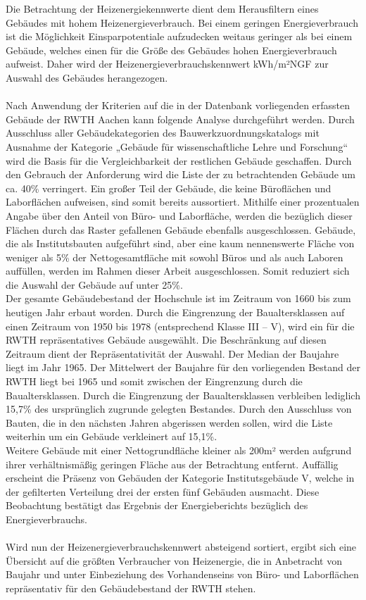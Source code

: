 Die Betrachtung der Heizenergiekennwerte dient dem Herausfiltern eines Gebäudes mit hohem Heizenergieverbrauch. Bei einem geringen Energieverbrauch ist die Möglichkeit Einsparpotentiale aufzudecken weitaus geringer als bei einem Gebäude, welches einen für die Größe des Gebäudes hohen Energieverbrauch aufweist. Daher wird der Heizenergieverbrauchskennwert kWh/m²NGF zur Auswahl des Gebäudes herangezogen. \\
\\
Nach Anwendung der Kriterien auf die in der Datenbank vorliegenden erfassten Gebäude der RWTH Aachen kann folgende Analyse durchgeführt werden.  Durch Ausschluss aller Gebäudekategorien des Bauwerkzuordnungskatalogs mit Ausnahme der Kategorie „Gebäude für wissenschaftliche Lehre und Forschung“ wird die Basis für die Vergleichbarkeit der restlichen Gebäude geschaffen. Durch den Gebrauch der Anforderung wird die Liste der zu betrachtenden Gebäude um ca. 40\% verringert. Ein großer Teil der Gebäude, die keine Büroflächen und Laborflächen aufweisen, sind somit bereits aussortiert. Mithilfe einer prozentualen Angabe über den Anteil von Büro- und Laborfläche, werden die bezüglich dieser Flächen durch das Raster gefallenen Gebäude ebenfalls ausgeschlossen. Gebäude, die als Institutsbauten aufgeführt sind, aber eine kaum nennenswerte Fläche von weniger als 5\% der Nettogesamtfläche mit sowohl Büros und als auch Laboren auffüllen, werden im Rahmen dieser Arbeit ausgeschlossen. Somit reduziert sich die Auswahl der Gebäude auf unter 25\%.\\
Der gesamte Gebäudebestand der Hochschule ist im Zeitraum von 1660 bis zum heutigen Jahr erbaut worden. Durch die Eingrenzung der Baualtersklassen auf einen Zeitraum von 1950 bis 1978 (entsprechend Klasse III – V), wird ein für die RWTH repräsentatives Gebäude ausgewählt. Die Beschränkung auf diesen Zeitraum dient der Repräsentativität der Auswahl. Der Median der Baujahre liegt im Jahr 1965.  Der Mittelwert der Baujahre für den vorliegenden Bestand der RWTH liegt bei 1965 und somit zwischen der Eingrenzung durch die Baualtersklassen. Durch die Eingrenzung der Baualtersklassen verbleiben lediglich 15,7\% des ursprünglich zugrunde gelegten Bestandes. Durch den Ausschluss von Bauten, die in den nächsten Jahren abgerissen werden sollen, wird die Liste weiterhin um ein Gebäude verkleinert auf 15,1\%. \\
Weitere Gebäude mit einer Nettogrundfläche kleiner als 200m² werden aufgrund ihrer verhältnismäßig geringen Fläche aus der Betrachtung entfernt. Auffällig erscheint die Präsenz von Gebäuden der Kategorie Institutsgebäude V, welche in der gefilterten Verteilung drei der ersten fünf Gebäuden ausmacht. Diese Beobachtung bestätigt das Ergebnis der Energieberichts bezüglich des Energieverbrauchs.\\
\\
Wird nun der Heizenergieverbrauchskennwert absteigend sortiert, ergibt sich eine Übersicht auf die größten Verbraucher von Heizenergie, die in Anbetracht von Baujahr und unter Einbeziehung des Vorhandenseins von Büro- und Laborflächen repräsentativ für den Gebäudebestand der RWTH stehen.  \\

